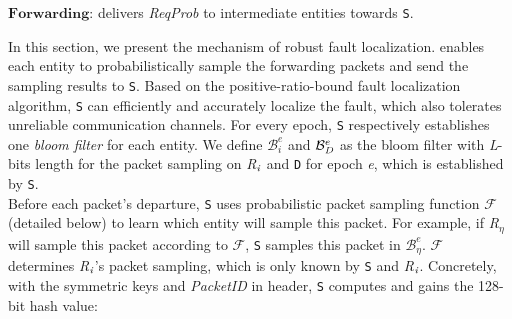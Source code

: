 \begin{algorithm}[t]
\begin{algorithmic}[1]
    $\textbf{Forwarding}$:
     delivers \emph{ReqProb} to intermediate entities towards {\tt S}.
\EndFunction
\iffalse
\Function {\emph{AckProb}$_\emph{i}$ Initialization by \emph{R}$_\emph{i}$~~} { }\\
    $\textbf{Require}$: $\emph{Path}^\emph{*}$, $\emph{SessionID}$, \emph{Epoch}, $\mathcal{B}_{\emph{R}_\emph{i}}^e$, \emph{K}$_\emph{S}$, \emph{K}$_{\emph{R}_\emph{i}}^{\emph{-}1}$\\
    $\textbf{Compute}$:
    \State \emph{Enc}$\mathcal{B}_{\emph{R}_\emph{i}}^e$~\emph{=}~\emph{Enc}$_{\emph{K}_{\emph{S,}{\emph{R}_\emph{i}}}}$($\mathcal{B}_{\emph{R}_\emph{i}}^e$)
    \State \emph{Sign}$\mathcal{B}_{\emph{R}_\emph{i}}^e$ \emph{=} \emph{Sign}$_{\emph{K}_{\emph{R}_\emph{i}}^{\emph{-1}}}$(\emph{H}(\emph{K}$_\emph{S}\vert\vert$\emph{Path}$^\emph{*}\vert \vert$\emph{SessionID}$\vert\vert \emph{Epoch} \vert \vert$\emph{TTL}$_{\emph{i}}^{\emph{ack}}\vert\vert$\emph{Enc}$\mathcal{B}_{\emph{R}_\emph{i}}^e$))
    \State \emph{AckProb}$_\emph{i}$\emph{ = }\{\emph{Path}$^\emph{*}$, \emph{SessionID}, \emph{Epoch}, \emph{Enc}$\mathcal{B}_{\emph{R}_\emph{i}}^e$, \emph{Sign}$\mathcal{B}_{\emph{R}_\emph{i}}^e$\}\\
    $\textbf{Forwarding}$:
    \State \emph{D} delivers \emph{AckProb}$_\emph{i}$ to intermediate entities towards \emph{S}.
\EndFunction
\fi
\end{algorithmic}
\end{algorithm}
In this section, we present the mechanism of robust fault localization. \name{} enables each entity to probabilistically sample the forwarding packets and send the sampling results to {\tt S}. Based on the positive-ratio-bound fault localization algorithm, {\tt S} can efficiently and accurately localize the fault, which also tolerates unreliable communication channels. For every epoch, {\tt S} respectively establishes one \emph{bloom filter} \cite{bloom1970space} for each entity. We define $\mathcal{B}_i^e$ and $\mathcal{B}_\emph{D}^e$ as the bloom filter with \emph{L}-bits length for the packet sampling on \emph{R}$_\emph{i}$ and {\tt D} for epoch \emph{e}, which is established by {\tt S}.\\
\indent
Before each packet's departure, {\tt S} uses probabilistic packet sampling function $\mathcal{F}$ (detailed below) to learn which entity will sample this packet. For example, if \emph{R}$_\eta$ will sample this packet according to $\mathcal{F}$, {\tt S} samples this packet in $\mathcal{B}_\eta^e$. $\mathcal{F}$ determines \emph{R}$_\emph{i}$'s packet sampling, which is only known by {\tt S} and \emph{R}$_\emph{i}$. Concretely, with the symmetric keys and \emph{PacketID} in \name{} header, {\tt S} computes and gains the 128-bit hash value:
